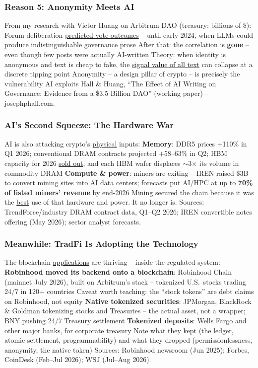 \documentclass[aspectratio=169]{beamer}
\begin{document}
\begin{frame}
\frametitle{Reason 5: Anonymity Meets AI}

\bi
\m From my research with Victor Huang on Arbitrum DAO (treasury: billions of \$): \pause
\m Forum deliberation \ul{predicted vote outcomes} -- until early 2024, when LLMs could produce indistinguishable governance prose \pause
\m After that: the correlation is \textbf{gone} -- even though few posts were actually AI-written \pause
\m Theory: when identity is anonymous and text is cheap to fake, the \ul{signal value of all text} can collapse at a discrete tipping point \pause
\m Anonymity -- a design pillar of crypto -- is precisely the vulnerability AI exploits
\ei
\vfill
{\scriptsize Hall \& Huang, ``The Effect of AI Writing on Governance: Evidence from a \$3.5 Billion DAO'' (working paper) -- josephphall.com.}

\end{frame}

\begin{frame}
\frametitle{AI's Second Squeeze: The Hardware War}

AI is also attacking crypto's \ul{physical} inputs:
\bi
\m \textbf{Memory}: DDR5 prices $+$110\% in Q1 2026; conventional DRAM contracts projected $+$58--63\% in Q2; HBM capacity for 2026 \ul{sold out}, and each HBM wafer displaces $\sim$3$\times$ its volume in commodity DRAM \pause
\m \textbf{Compute \& power}: miners are exiting -- IREN raised \$3B to convert mining sites into AI data centers; forecasts put AI/HPC at up to \textbf{70\% of listed miners' revenue} by end-2026 \pause
\m Mining secured the chain because it was the \ul{best} use of that hardware and power. It no longer is.
\ei
\vfill
{\scriptsize Sources: TrendForce/industry DRAM contract data, Q1--Q2 2026; IREN convertible notes offering (May 2026); sector analyst forecasts.}

\end{frame}

\begin{frame}
\frametitle{Meanwhile: TradFi Is Adopting the Technology}

The blockchain \ul{applications} are thriving -- inside the regulated system:
\bi
\m \textbf{Robinhood moved its backend onto a blockchain}: Robinhood Chain (mainnet July 2026), built on Arbitrum's stack -- tokenized U.S.\ stocks trading 24/7 in 120+ countries \pause
\bi
\m Caveat worth teaching: the ``stock tokens'' are debt claims on Robinhood, not equity \pause
\ei
\m \textbf{Native tokenized securities}: JPMorgan, BlackRock \& Goldman tokenizing stocks and Treasuries -- the actual asset, not a wrapper; BNY pushing 24/7 Treasury settlement \pause
\m \textbf{Tokenized deposits}: Wells Fargo and other major banks, for corporate treasury \pause
\m Note what they kept (the ledger, atomic settlement, programmability) and what they dropped (permissionlessness, anonymity, the native token)
\ei
\vfill
{\scriptsize Sources: Robinhood newsroom (Jun 2025); Forbes, CoinDesk (Feb--Jul 2026); WSJ (Jul--Aug 2026).}

\end{frame}
\end{document}
